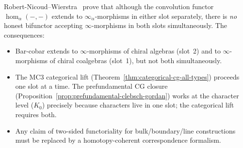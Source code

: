 \begin{remark}
\label{rem:no-bifunctor}
Robert-Nicoud--Wierstra~\cite[Section~6]{RNW19} prove that although
the convolution functor $\operatorname{hom}_\alpha(-,-)$ extends to
$\infty_\alpha$-morphisms in either slot separately, there is
\emph{no} honest bifunctor accepting $\infty$-morphisms in both slots
simultaneously. The consequences:
\begin{itemize}
\item Bar-cobar extends to $\infty$-morphisms of chiral algebras (slot~2)
 and to $\infty$-morphisms of chiral coalgebras (slot~1), but not both
 simultaneously.
\item The MC3 categorical lift
 (Theorem~\ref{thm:categorical-cg-all-types}) proceeds one slot at a
 time. The prefundamental CG closure
 (Proposition~\ref{prop:prefundamental-clebsch-gordan}) works at the
 character level ($K_0$) precisely because characters live in one slot;
 the categorical lift requires both.
\item Any claim of two-sided functoriality for bulk/boundary/line
 constructions must be replaced by a homotopy-coherent correspondence
 formalism.
\end{itemize}
\end{remark}

